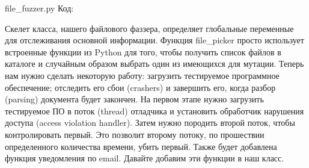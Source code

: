 \documentclass[12pt, a4paper, oneside]{book}
\begin{document}
file\_fuzzer.py
Код:





        



Скелет класса, нашего файлового фаззера, определяет глобальные переменные для отслеживания основной информации. Функция file\_picker просто использует встроенные функции из Python для того, чтобы получить список файлов в каталоге и случайным образом выбрать один из имеющихся для мутации. Теперь нам нужно сделать некоторую работу: загрузить тестируемое программное обеспечение; отследить его сбои (crashers) и завершить его, когда разбор (parsing) документа будет закончен. На первом этапе нужно загрузить тестируемое ПО в поток (thread) отладчика и установить обработчик нарушения доступа (access violation handler). Затем нужно породить второй поток, чтобы контролировать первый. Это позволит второму потоку, по прошествии определенного количества времени, убить первый. Также будет добавлена функция уведомления по email. Давайте добавим эти функции в наш класс.
\end{document}
